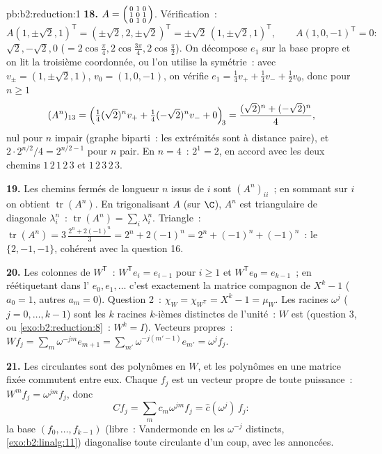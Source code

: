 \begin{solution}{pb:b2:reduction:1}
\textbf{18.} $A = \begin{psmallmatrix} 0&1&0\\ 1&0&1\\
0&1&0\end{psmallmatrix}$. Vérification~:
\[
A(1, \pm\sqrt2, 1)^{\mathsf T}
= (\pm\sqrt2, 2, \pm\sqrt2)^{\mathsf T}
= \pm\sqrt2\,(1, \pm\sqrt2, 1)^{\mathsf T},
\qquad
A(1, 0, -1)^{\mathsf T} = 0 :
\]
 $\sqrt2, -\sqrt2, 0$ ($= 2\cos\frac\pi4,
2\cos\frac{3\pi}4, 2\cos\frac\pi2$). On décompose $e_1$ sur la base
propre et on lit la troisième coordonnée, ou l'on utilise la
symétrie~: avec $v_\pm = (1, \pm\sqrt2, 1)$, $v_0 = (1, 0, -1)$, on
vérifie $e_1 = \frac14 v_+ + \frac14 v_- + \frac12 v_0$, donc pour $n
\geq 1$
\[
(A^n)_{13} = \Bigl(\tfrac14(\sqrt2)^n v_+ +
\tfrac14(-\sqrt2)^n v_- + 0\Bigr)_{\!3}
= \frac{(\sqrt2)^n + (-\sqrt2)^n}{4},
\]
nul pour $n$ impair (graphe biparti~: les extrémités sont à distance
paire), et $2\cdot 2^{n/2}/4 = 2^{n/2 - 1}$ pour $n$ pair. En $n =
4$~: $2^{1} = 2$, en accord avec les deux chemins $1\,2\,1\,2\,3$ et
$1\,2\,3\,2\,3$.

\textbf{19.} Les chemins fermés de longueur $n$ issus de $i$ sont
$(A^n)_{ii}$~; en sommant sur $i$ on obtient $\operatorname{tr}(A^n)$.
En trigonalisant $A$ (sur $\C$), $A^n$ est triangulaire de diagonale
$\lambda_i^n$~: $\operatorname{tr}(A^n) = \sum_i\lambda_i^n$.
Triangle~: $\operatorname{tr}(A^n) = 3\,\frac{2^n + 2(-1)^n}3 =
2^n + 2(-1)^n = 2^n + (-1)^n + (-1)^n$~: le  $\{2, -1, -1\}$,
cohérent avec la question 16.

\textbf{20.} Les colonnes de $W^{\mathsf T}$~: $W^{\mathsf T}e_i =
e_{i-1}$ pour $i \geq 1$ et $W^{\mathsf T}e_0 = e_{k-1}$~; en
réétiquetant dans l' $e_0, e_1, \dots$ c'est exactement la
matrice compagnon de $X^k - 1$ ($a_0 = 1$, autres $a_m = 0$).
Question 2~: $\chi_{W} = \chi_{W^{\mathsf T}} = X^k - 1 = \mu_{W}$.
Les racines $\omega^j$ ($j = 0, \dots, k-1$) sont les $k$ racines
$k$-ièmes distinctes de l'unité~: $W$ est  (question 3,
ou \cref{exo:b2:reduction:8}~: $W^k = I$). Vecteurs propres~: $Wf_j
= \sum_m \omega^{-jm}e_{m+1} = \sum_{m'}\omega^{-j(m'-1)}e_{m'}
= \omega^j f_j$.

\textbf{21.} Les circulantes sont des polynômes en $W$, et les
polynômes en une matrice fixée commutent entre eux. Chaque $f_j$ est
un vecteur propre de toute puissance~: $W^m f_j = \omega^{jm}f_j$,
donc
\[
Cf_j = \sum_m c_m\omega^{jm} f_j = \widehat c(\omega^j)\,f_j :
\]
la base $(f_0, \dots, f_{k-1})$ (libre~: Vandermonde en les
$\omega^{-j}$ distincts, \cref{exo:b2:linalg:11}) diagonalise toute
circulante d'un coup, avec les  annoncées.


\end{solution}
